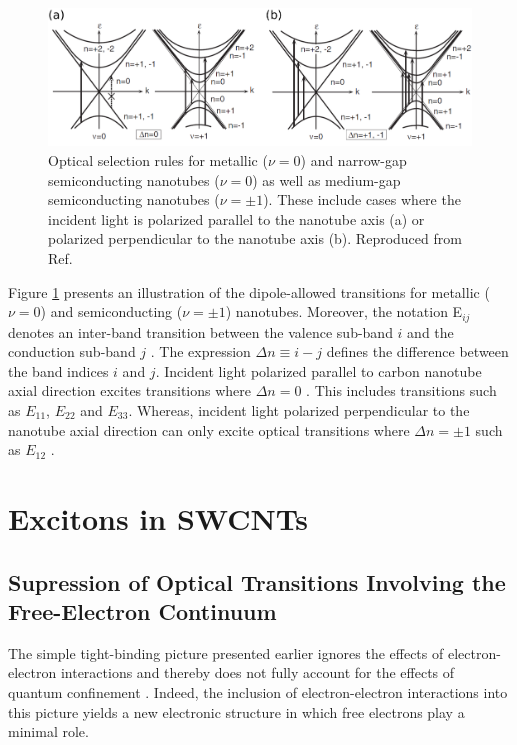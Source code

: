 \begin{figure}[ht]
	\centering
	\includegraphics[scale= 0.52]{images/chapter_optical_props/selection_rules_combined}
	\caption{Optical selection rules for metallic ($\nu = 0 $) and narrow-gap semiconducting nanotubes ($\nu = 0 $) as well as medium-gap semiconducting nanotubes ($\nu = \pm 1$). These include cases where the incident light is polarized parallel to the nanotube axis (a) or polarized perpendicular to the nanotube axis (b). Reproduced from Ref.\ \cite{ando2005theory}}
	\label{fig:allowed_optical_transitions}
\end{figure}

Figure \ref{fig:allowed_optical_transitions} presents an illustration of the dipole-allowed transitions for metallic ($\nu = 0$) and semiconducting ($\nu=\pm 1$) nanotubes. Moreover, the notation E$_{ij}$ denotes an inter-band transition between the valence sub-band $i$ and the conduction sub-band $j$ \cite{weismanKonoBook}. The expression $\Delta n \equiv i - j$ defines the difference between the band indices $i$ and $j$. Incident light polarized parallel to carbon nanotube axial direction excites transitions where $\Delta n = 0$ \cite{weismanKonoBook}. This includes transitions such as $E_{11}$, $E_{22}$ and $E_{33}$. Whereas, incident light polarized perpendicular to the nanotube axial direction can only excite optical transitions where $\Delta n = \pm 1$ such as $E_{12}$ \cite{weismanKonoBook}.



\section{Excitons in SWCNTs}

\subsection{Supression of Optical Transitions Involving the Free-Electron Continuum}
The simple tight-binding picture presented earlier ignores the effects of electron-electron interactions and thereby does not fully account for the effects of quantum confinement \cite{weismanKonoBook}. Indeed, the inclusion of electron-electron interactions into this picture yields a new electronic structure in which free electrons play a minimal role.

